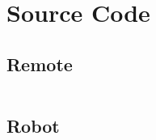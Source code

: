 \documentclass[12pt,letterpaper]{article}
\begin{document}
\section{Source Code}

\subsection{Remote}

\begin{verbatim}
\end{verbatim}

\subsection{Robot}

\begin{verbatim}
\end{verbatim}
\end{document}
